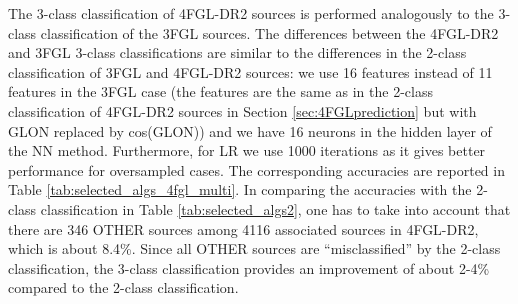 \begin{table}[!h]
    \caption{
    Comparison of classes predicted for unassociated sources in the 3FGL catalog using 3-class classification
    with associations in the 4FGL-DR2 catalog.}
    \label{tab:3FGL_vs_4FGL_3class}

\centering
{}
\end{table}



The 3-class classification of 4FGL-DR2 sources is performed analogously to the 3-class classification of the 3FGL sources.
The differences between the 4FGL-DR2 and 3FGL 3-class classifications are similar to the differences in the 2-class classification of 3FGL and 4FGL-DR2 sources:
we use 16 features instead of 11 features in the 3FGL case (the features are the same as in the 2-class classification of 4FGL-DR2 sources in Section \ref{sec:4FGLprediction} but with GLON replaced by cos(GLON))
and we have 16 neurons in the hidden layer of the NN method. Furthermore, for LR we use 1000 iterations as it gives better performance for oversampled cases.
The corresponding accuracies are reported in Table \ref{tab:selected_algs_4fgl_multi}.
In comparing the accuracies with the 2-class classification in Table \ref{tab:selected_algs2}, 
one has to take into account that there are 346 OTHER sources among 4116 associated sources in 4FGL-DR2, which is about 8.4\%.
Since all OTHER sources are ``misclassified'' by the 2-class classification, the 3-class classification provides an improvement of about 2-4\% compared to the 2-class classification.

